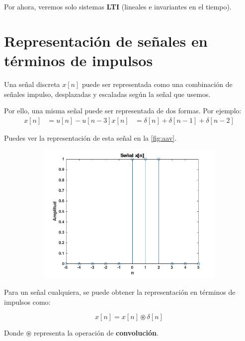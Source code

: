 \documentclass[a4paper]{book}
\begin{document}
Por ahora, veremos solo sistemas \textbf{LTI} (lineales e invariantes en el tiempo).

\section{Representación de señales en términos de impulsos}

Una señal discreta $x[n]$ puede ser representada como una combinación de señales impulso, desplazadas y escaladas según la señal que usemos.

Por ello, una misma señal puede ser representada de dos formas. Por ejemplo:
\begin{align*}
	x[n] & = u[n] - u[n-3]
	x[n] & = \delta[n] + \delta[n-1] + \delta[n-2]
\end{align*}

Puedes ver la representación de esta señal en la \autoref{fig:aav}.

\begin{figure}[!ht]
	\caption{Representación de la señal $x[n]$}
	\label{fig:aav}
	\centering
	\begin{subfigure}[b]{0.75\linewidth}
		\includegraphics[width=\linewidth]{./Imágenes/aav.png}
	\end{subfigure}
\end{figure}

Para un señal cualquiera, se puede obtener la representación en términos de impulsos como:

\[ x[n] = x[n] \circledast \delta [n] \]

Donde $\circledast$ representa la operación de \textbf{convolución}.
\end{document}
